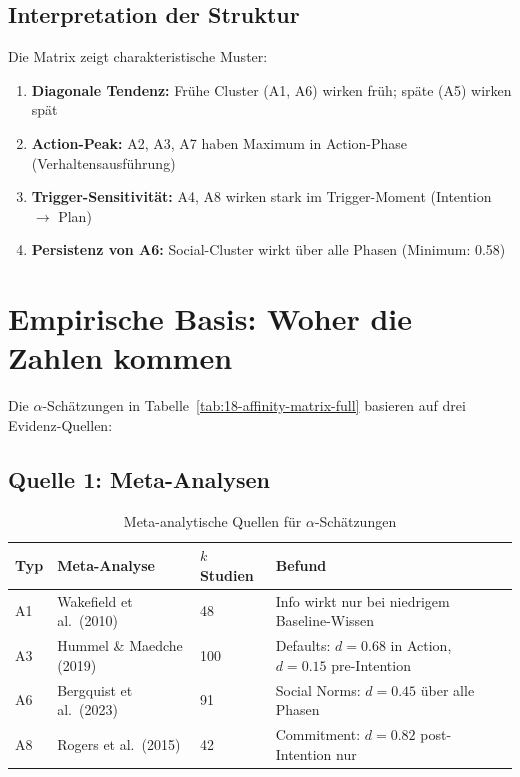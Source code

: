 \subsection{Interpretation der Struktur}

Die Matrix zeigt charakteristische Muster:

\begin{enumerate}
\item \textbf{Diagonale Tendenz:} Fr\"{u}he Cluster (A1, A6) wirken fr\"{u}h; sp\"{a}te (A5) wirken sp\"{a}t
\item \textbf{Action-Peak:} A2, A3, A7 haben Maximum in Action-Phase (Verhaltensausf\"{u}hrung)
\item \textbf{Trigger-Sensitivit\"{a}t:} A4, A8 wirken stark im Trigger-Moment (Intention $\rightarrow$ Plan)
\item \textbf{Persistenz von A6:} Social-Cluster wirkt \"{u}ber alle Phasen (Minimum: 0.58)
\end{enumerate}


\section{Empirische Basis: Woher die Zahlen kommen}
\label{sec:18-empirical}

Die $\alpha$-Schätzungen in Tabelle~\ref{tab:18-affinity-matrix-full} basieren auf drei Evidenz-Quellen:

\subsection{Quelle 1: Meta-Analysen}

\begin{table}[htbp]
\centering
\caption{Meta-analytische Quellen für $\alpha$-Schätzungen}
\label{tab:18-meta-sources}
\renewcommand{\arraystretch}{1.3}
\small
\begin{tabular}{@{}llll@{}}
\toprule
\textbf{Typ} & \textbf{Meta-Analyse} & \textbf{$k$ Studien} & \textbf{Befund} \\
\midrule
A1 & Wakefield et al.\ (2010) & 48 & Info wirkt nur bei niedrigem Baseline-Wissen \\
A3 & Hummel \& Maedche (2019) & 100 & Defaults: $d = 0.68$ in Action, $d = 0.15$ pre-Intention \\
A6 & Bergquist et al.\ (2023) & 91 & Social Norms: $d = 0.45$ \"{u}ber alle Phasen \\
A8 & Rogers et al.\ (2015) & 42 & Commitment: $d = 0.82$ post-Intention nur \\
\bottomrule
\end{tabular}
\end{table}

